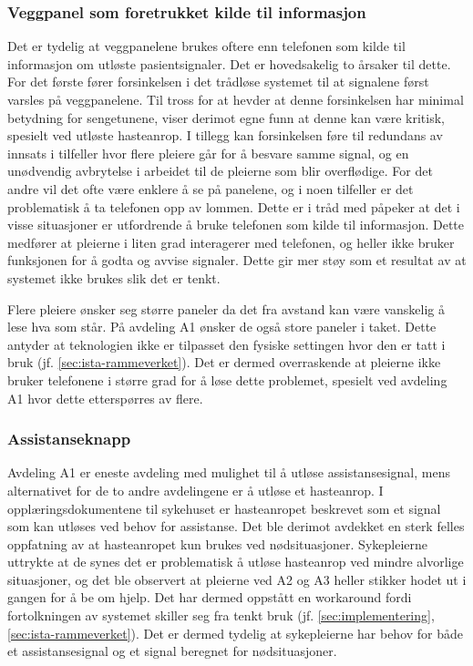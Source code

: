\subsubsection{Veggpanel som foretrukket kilde til informasjon}
Det er tydelig at veggpanelene brukes oftere enn telefonen som kilde til informasjon om utløste pasientsignaler. Det er hovedsakelig to årsaker til dette. For det første fører forsinkelsen i det trådløse systemet til at signalene først varsles på veggpanelene. Til tross for at \citep{Sletten09} hevder at denne forsinkelsen har minimal betydning for sengetunene, viser derimot egne funn at denne kan være kritisk, spesielt ved utløste hasteanrop. I tillegg kan forsinkelsen føre til redundans av innsats i tilfeller hvor flere pleiere går for å besvare samme signal, og en unødvendig avbrytelse i arbeidet til de pleierne som blir overflødige. For det andre vil det ofte være enklere å se på panelene, og i noen tilfeller er det problematisk å ta telefonen opp av lommen.  Dette er i tråd med \citet{klemets13} påpeker at det i visse situasjoner er utfordrende å bruke telefonen som kilde til informasjon. Dette medfører at pleierne i liten grad interagerer med telefonen, og heller ikke bruker funksjonen for å godta og avvise signaler. Dette gir mer støy som et resultat av at systemet ikke brukes slik det er tenkt.

\noindent
Flere pleiere ønsker seg større paneler da det fra avstand kan være vanskelig å lese hva som står. På avdeling A1 ønsker de også store paneler i taket. Dette antyder at teknologien ikke er tilpasset den fysiske settingen hvor den er tatt i bruk (jf. \ref{sec:ista-rammeverket}). Det er dermed overraskende at pleierne ikke bruker telefonene i større grad for å løse dette problemet, spesielt ved avdeling A1 hvor dette etterspørres av flere.

\subsubsection{Assistanseknapp}
Avdeling A1 er eneste avdeling med mulighet til å utløse assistansesignal, mens alternativet for de to andre avdelingene er å utløse et hasteanrop. I opplæringsdokumentene til sykehuset er hasteanropet beskrevet som et signal som kan utløses ved behov for assistanse. Det ble derimot avdekket en sterk felles oppfatning av at hasteanropet kun brukes ved nødsituasjoner. Sykepleierne uttrykte at de synes det er problematisk å utløse hasteanrop ved mindre alvorlige situasjoner, og det ble observert at pleierne ved A2 og A3 heller stikker hodet ut i gangen for å be om hjelp. Det har dermed oppstått en workaround fordi fortolkningen av systemet skiller seg fra tenkt bruk (jf. \ref{sec:implementering}, \ref{sec:ista-rammeverket}). Det er dermed tydelig at sykepleierne har behov for både et assistansesignal og et signal beregnet for nødsituasjoner.
  
